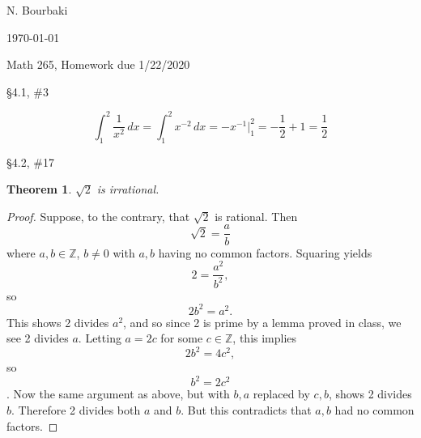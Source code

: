 \documentclass[11pt]{report}
\theoremstyle{plain}
\newtheorem{thm}{Theorem}
\begin{document}
\hfill N. Bourbaki

\hfill \today

\begin{center}
Math 265, Homework due 1/22/2020
\end{center}
\begin{description}
\item{\S 4.1, \#3}

$$\int_1^2 \frac 1 {x^2} \, dx=\int_1^2 x^{-2} \, dx=-x^{-1} \Big |_1^2=-\frac 12+1=\frac 12$$

\item{\S 4.2, \#17}

\begin{thm} $\sqrt 2$ is irrational.
\end{thm}
\begin{proof}
Suppose, to the contrary, that $\sqrt 2$ is rational. Then
$$\sqrt 2=\frac ab$$
where $a,b\in \mathbb Z$, $b\not = 0$ with $a,b$ having no common factors. Squaring yields
$$2=\frac {a^2}{b^2},$$
so
$$2b^2=a^2.$$
This shows 2 divides $a^2$, and so since 2 is prime by a lemma proved in class, we see 2 divides $a$. Letting $a=2c$ for some $c\in \mathbb Z$, this implies
$$2b^2=4c^2,$$ so
$$b^2=2c^2$$.
Now the same argument as above, but with $b,a$ replaced by $c,b$, shows 2 divides $b$. Therefore 2 divides both $a$ and $b$. But this contradicts that $a,b$ had no common factors.
\end{proof}

\end{description}
\end{document}
